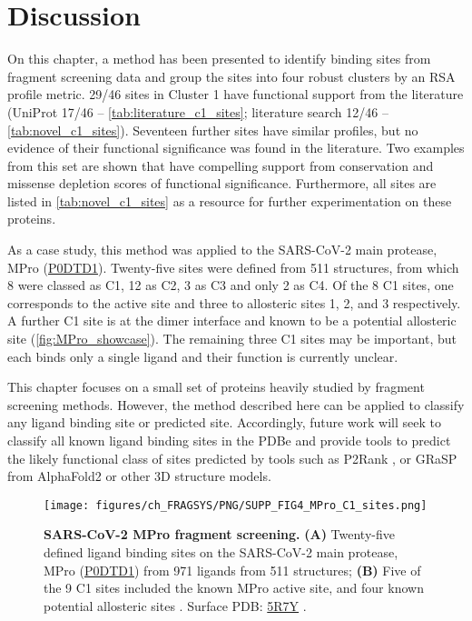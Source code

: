 \section{Discussion}

On this chapter, a method has been presented to identify binding sites from fragment screening data and group the sites into four robust clusters by an RSA profile metric. 29/46 sites in Cluster 1 have functional support from the literature (UniProt 17/46 -- \autoref{tab:literature_c1_sites}; literature search 12/46 -- \autoref{tab:novel_c1_sites}). Seventeen further sites have similar profiles, but no evidence of their functional significance was found in the literature. Two examples from this set are shown that have compelling support from conservation and missense depletion scores of functional significance. Furthermore, all sites are listed in \autoref{tab:novel_c1_sites} as a resource for further experimentation on these proteins.

As a case study, this method was applied to the SARS-CoV-2 main protease, MPro (\href{https://www.uniprot.org/uniprotkb/P0DTD1/entry}{P0DTD1}). Twenty-five sites were defined from 511 structures, from which 8 were classed as C1, 12 as C2, 3 as C3 and only 2 as C4. Of the 8 C1 sites, one corresponds to the active site and three to allosteric sites 1, 2, and 3 \cite{DASGUPTA_2022_ALLOSTERIC} respectively. A further C1 site is at the dimer interface and known to be a potential allosteric site \cite{DOUANGAMATH_2020_SARSCOV2} (\autoref{fig:MPro_showcase}). The remaining three C1 sites may be important, but each binds only a single ligand and their function is currently unclear.

This chapter focuses on a small set of proteins heavily studied by fragment screening methods. However, the method described here can be applied to classify any ligand binding site or predicted site. Accordingly, future work will seek to classify all known ligand binding sites in the PDBe and provide tools to predict the likely functional class of sites predicted by tools such as P2Rank \cite{KRIVAK_2018_P2RANK}, or GRaSP \cite{SANTANA_2020_GRaSP, SANTANA_2022_GRaSP} from AlphaFold2 \cite{JUMPER_2021_ALPHAFOLD, VARADI_2022_ALPHAFOLDDB} or other 3D structure models.

\begin{figure}[ht!]
    \centering
    \texttt{[image: figures/ch\_FRAGSYS/PNG/SUPP\_FIG4\_MPro\_C1\_sites.png]}
    \caption[SARS-CoV-2 MPro fragment screening]{\textbf{SARS-CoV-2 MPro fragment screening.} \textbf{(A)} Twenty-five defined ligand binding sites on the SARS-CoV-2 main protease, MPro (\href{https://www.uniprot.org/uniprotkb/P0DTD1/entry}{P0DTD1}) from 971 ligands from 511 structures; \textbf{(B)} Five of the 9 C1 sites included the known MPro active site, and four known potential allosteric sites \cite{DOUANGAMATH_2020_SARSCOV2, DASGUPTA_2022_ALLOSTERIC}. Surface PDB: \href{https://www.ebi.ac.uk/pdbe/entry/pdb/5R7Y}{5R7Y} \cite{DOUANGAMATH_2020_SARSCOV2}.}
    \label{fig:MPro_showcase}
\end{figure}

